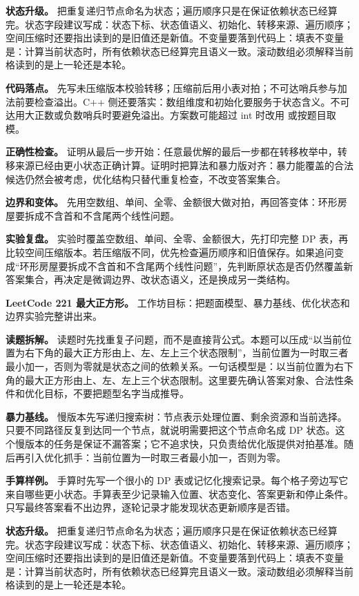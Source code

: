 \textbf{状态升级。} 把重复递归节点命名为状态；遍历顺序只是在保证依赖状态已经算完。状态字段建议写成：状态下标、状态值语义、初始化、转移来源、遍历顺序；空间压缩时还要指出读到的是旧值还是新值。不变量要落到代码上：填表不变量是：计算当前状态时，所有依赖状态已经算完且语义一致。滚动数组必须解释当前格读到的是上一轮还是本轮。

\textbf{代码落点。} 先写未压缩版本校验转移；压缩前后用小表对拍；不可达哨兵参与加法前要检查溢出。C++ 侧还要落实：数组维度和初始化要服务于状态含义。不可达用大正数或负数哨兵时要避免溢出。方案数可能超过 int 时改用  或按题目取模。

\textbf{正确性检查。} 证明从最后一步开始：任意最优解的最后一步都在转移枚举中，转移来源已经由更小状态正确计算。证明时把算法和暴力版对齐：暴力能覆盖的合法候选仍然会被考虑，优化结构只替代重复检查，不改变答案集合。

\textbf{边界和变体。} 先用空数组、单间、全零、金额很大做对拍，再回答变体：环形房屋要拆成不含首和不含尾两个线性问题。

\textbf{实验复盘。} 实验时覆盖空数组、单间、全零、金额很大，先打印完整 DP 表，再比较空间压缩版本。若压缩版不同，优先检查遍历顺序和旧值保存。如果追问变成“环形房屋要拆成不含首和不含尾两个线性问题”，先判断原状态是否仍然覆盖新答案集合，再决定是微调边界、改状态语义，还是换成另一类结构。

\noindent\textbf{LeetCode 221 最大正方形。} 工作坊目标：把题面模型、暴力基线、优化状态和边界实验完整讲出来。

\textbf{读题拆解。} 读题时先找重复子问题，而不是直接背公式。本题可以压成“以当前位置为右下角的最大正方形由上、左、左上三个状态限制”，当前位置为一时取三者最小加一，否则为零就是状态之间的依赖关系。一句话模型是：以当前位置为右下角的最大正方形由上、左、左上三个状态限制。这里要先确认答案对象、合法性条件和优化目标，不要把题型名字当成推导。

\textbf{暴力基线。} 慢版本先写递归搜索树：节点表示处理位置、剩余资源和当前选择。只要不同路径反复到达同一个节点，就说明需要把这个节点命名成 DP 状态。这个慢版本的任务是保证不漏答案；它不追求快，只负责给优化版提供对拍基准。随后再引入优化抓手：当前位置为一时取三者最小加一，否则为零。

\textbf{手算样例。} 手算时先写一个很小的 DP 表或记忆化搜索记录。每个格子旁边写它来自哪些更小状态。手算表至少记录输入位置、状态变化、答案更新和停止条件。只写最终答案看不出边界，逐轮记录才能发现状态更新顺序是否错。

\textbf{状态升级。} 把重复递归节点命名为状态；遍历顺序只是在保证依赖状态已经算完。状态字段建议写成：状态下标、状态值语义、初始化、转移来源、遍历顺序；空间压缩时还要指出读到的是旧值还是新值。不变量要落到代码上：填表不变量是：计算当前状态时，所有依赖状态已经算完且语义一致。滚动数组必须解释当前格读到的是上一轮还是本轮。

